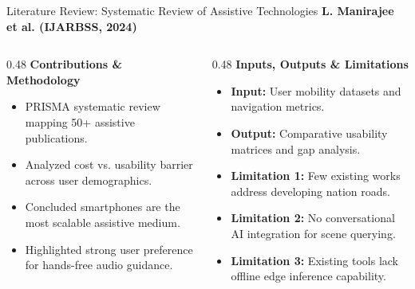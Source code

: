 \begin{frame}{Literature Review: Systematic Review of Assistive Technologies}
{\large\textbf{\textcolor{MyUnivGreen}{L. Manirajee et al. (IJARBSS, 2024) \cite{manirajee2024assistive}}}}\\[6pt]

\begin{columns}[T]
  \begin{column}{0.48\textwidth}
    \textbf{\textcolor{MyUnivGreen}{Contributions \& Methodology}}\\[4pt]
    \begin{itemize}
      \item PRISMA systematic review mapping 50+ assistive publications.
      \item Analyzed cost vs. usability barrier across user demographics.
      \item Concluded smartphones are the most scalable assistive medium.
      \item Highlighted strong user preference for hands-free audio guidance.
    \end{itemize}
  \end{column}
  
  \begin{column}{0.48\textwidth}
    \textbf{\textcolor{MyUnivGreen}{Inputs, Outputs \& Limitations}}\\[4pt]
    \begin{itemize}
      \item \textbf{Input:} User mobility datasets and navigation metrics.
      \item \textbf{Output:} Comparative usability matrices and gap analysis.
      \item \textbf{Limitation 1:} Few existing works address developing nation roads.
      \item \textbf{Limitation 2:} No conversational AI integration for scene querying.
      \item \textbf{Limitation 3:} Existing tools lack offline edge inference capability.
    \end{itemize}
  \end{column}
\end{columns}
\end{frame}